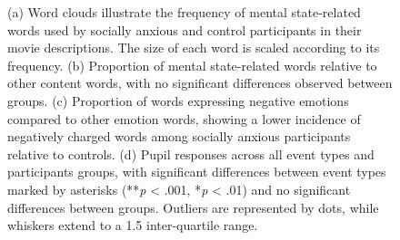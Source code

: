\begin{figure}[!ht]
	\centering
	\caption{(a) Word clouds illustrate the frequency of mental state-related words used by socially anxious and control participants in their movie descriptions. The size of each word is scaled according to its frequency. (b) Proportion of mental state-related words relative to other content words, with no significant differences observed between groups. (c) Proportion of words expressing negative emotions compared to other emotion words, showing a lower incidence of negatively charged words among socially anxious participants relative to controls. (d) Pupil responses across all event types and participants groups, with significant differences between event types marked by asterisks (**\textit{p} < .001, *\textit{p} < .01) and no significant differences between groups. Outliers are represented by dots, while whiskers extend to a 1.5 inter-quartile range.}
    \vspace*{-10pt}
	\label{fig:beh-pupil}
\end{figure}

